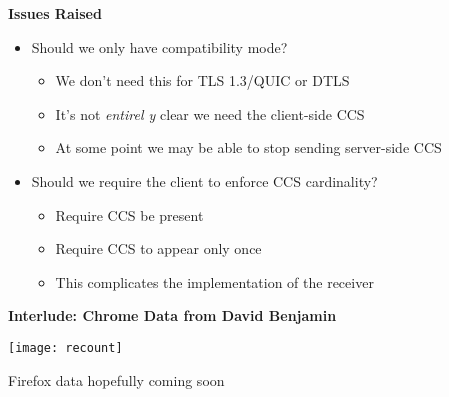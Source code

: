 \documentclass[helvetica]{seminar}
\newcommand{\heading}[1]{%
  \begin{center} 
    \large\bf 
    #1 
  \end{center} 
  \vspace{.4 in}}
\begin{document}
\begin{slide}
  \heading{Issues Raised}

  \begin{itemize}
  \item Should we \textsf{only} have compatibility mode?
    \begin{itemize}
    \item We don't need this for TLS 1.3/QUIC or DTLS
    \item It's not \emph{entirel
        y} clear we need the client-side CCS
    \item At some point we may be able to stop sending server-side CCS
    \end{itemize}

  \item Should we require the client to enforce CCS cardinality?
    \begin{itemize}
    \item Require CCS be present
    \item Require CCS to appear only once
    \item This complicates the implementation of the receiver
    \end{itemize}
  \end{itemize}
\end{slide}


\begin{slide}
\heading{Interlude: Chrome Data from David Benjamin}

\texttt{[image: recount]}

\vspace{1ex}

Firefox data hopefully coming soon

\end{slide}
\end{document}
